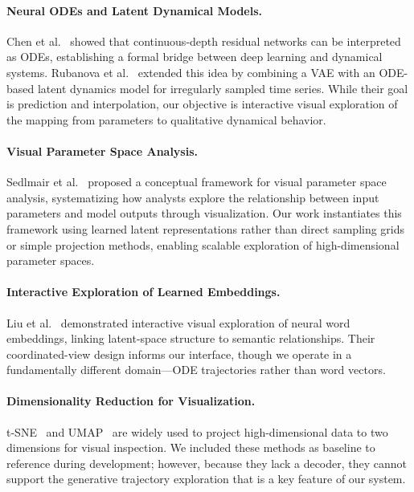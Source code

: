 \documentclass{article}
\begin{document}
\paragraph{Neural ODEs and Latent Dynamical Models.}
Chen et al.~\cite{chen2018neural} showed that continuous-depth residual
networks can be interpreted as ODEs, establishing a formal bridge between deep
learning and dynamical systems. Rubanova et
al.~\cite{rubanova2019latent} extended this idea by combining a VAE with an
ODE-based latent dynamics model for irregularly sampled time series. While
their goal is prediction and interpolation, our objective is interactive visual
exploration of the mapping from parameters to qualitative dynamical behavior.

\paragraph{Visual Parameter Space Analysis.}
Sedlmair et al.~\cite{sedlmair2014visual} proposed a conceptual framework for
visual parameter space analysis, systematizing how analysts explore the
relationship between input parameters and model outputs through visualization.
Our work instantiates this framework using learned latent representations
rather than direct sampling grids or simple projection methods, enabling
scalable exploration of high-dimensional parameter spaces.

\paragraph{Interactive Exploration of Learned Embeddings.}
Liu et al.~\cite{liu2018visual} demonstrated interactive visual exploration of
neural word embeddings, linking latent-space structure to semantic
relationships. Their coordinated-view design informs our interface, though we
operate in a fundamentally different domain---ODE trajectories rather than word
vectors.

\paragraph{Dimensionality Reduction for Visualization.}
t-SNE~\cite{vandermaaten2008visualizing} and UMAP~\cite{mcinnes2018umap} are
widely used to project high-dimensional data to two dimensions for visual
inspection. We included these methods as baseline to reference during development; however, because they lack a
decoder, they cannot support the generative trajectory exploration that is a
key feature of our system.
\end{document}
